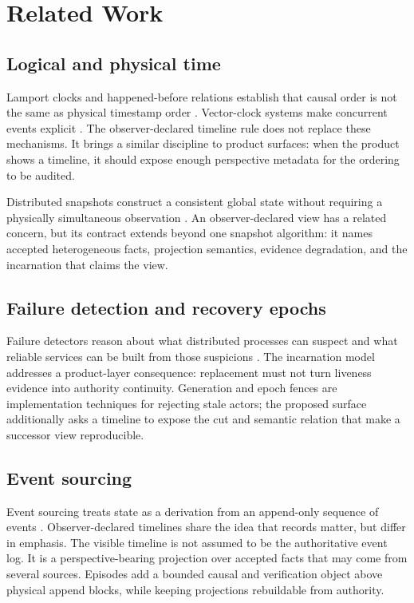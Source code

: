 \section{Related Work}
\label{sec:related}

\subsection{Logical and physical time}

Lamport clocks and happened-before relations establish that causal order is not
the same as physical timestamp order \cite{lamport1978time}. Vector-clock
systems make concurrent events explicit \cite{mattern1989virtual}. The
observer-declared timeline rule does not replace these mechanisms. It brings a
similar discipline to product surfaces: when the product shows a timeline, it
should expose enough perspective metadata for the ordering to be audited.

Distributed snapshots construct a consistent global state without requiring a
physically simultaneous observation \cite{chandy1985snapshots}. An
observer-declared view has a related concern, but its contract extends beyond
one snapshot algorithm: it names accepted heterogeneous facts, projection
semantics, evidence degradation, and the incarnation that claims the view.

\subsection{Failure detection and recovery epochs}

Failure detectors reason about what distributed processes can suspect and what
reliable services can be built from those suspicions \cite{chandra1996failure}.
The incarnation model addresses a product-layer consequence: replacement must
not turn liveness evidence into authority continuity. Generation and epoch
fences are implementation techniques for rejecting stale actors; the proposed
surface additionally asks a timeline to expose the cut and semantic relation
that make a successor view reproducible.

\subsection{Event sourcing}

Event sourcing treats state as a derivation from an append-only sequence of
events \cite{fowler2005eventsourcing}. Observer-declared timelines share the
idea that records matter, but differ in emphasis. The visible timeline is not
assumed to be the authoritative event log. It is a perspective-bearing
projection over accepted facts that may come from several sources. Episodes add
a bounded causal and verification object above physical append blocks, while
keeping projections rebuildable from authority.

